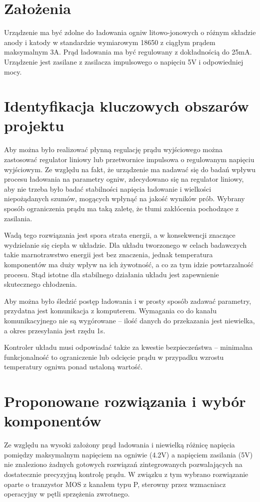 \documentclass[polish,engineer]{polsl-msth}
\begin{document}
\section{Założenia}
Urządzenie ma być zdolne do ładowania ogniw litowo-jonowych o różnym składzie anody i katody w standardzie wymiarowym 18650 z ciągłym prądem maksymalnym 3A. Prąd ładowania ma być regulowany z dokładnością do 25mA. Urządzenie jest zasilane z zasilacza impulsowego o napięciu 5V i odpowiedniej mocy.
\section{Identyfikacja kluczowych obszarów projektu}
Aby można było realizować płynną regulację prądu wyjściowego można zastosować regulator liniowy lub przetwornice impulsowa o regulowanym napięciu wyjściowym. Ze względu na fakt, że urządzenie ma nadawać się do badań wpływu procesu ładowania na parametry ogniw, zdecydowano się na regulator liniowy, aby nie trzeba było badać stabilności napięcia ładowanie i wielkości niepożądanych szumów, mogących wpłynąć na jakość wyników prób. Wybrany sposób ograniczenia prądu ma taką zaletę, że tłumi zakłócenia pochodzące z zasilania.

Wadą tego rozwiązania jest spora strata energii, a w konsekwencji znaczące wydzielanie się ciepła w układzie. Dla układu tworzonego w celach badawczych takie marnotrawstwo energii jest bez znaczenia, jednak temperatura komponentów ma duży wpływ na ich żywotność, a co za tym idzie powtarzalność procesu. Stąd istotne dla stabilnego działania układu jest zapewnienie skutecznego chłodzenia.

Aby można było śledzić postęp ładowania i w prosty sposób zadawać parametry, przydatna jest komunikacja z komputerem. Wymagania co do kanału komunikacyjnego nie są wygórowane – ilość danych do przekazania jest niewielka, a okres przesyłania jest rzędu 1s.

Kontroler układu musi odpowiadać także za kwestie bezpieczeństwa – minimalna funkcjonalność to ograniczenie lub odcięcie prądu w przypadku wzrostu temperatury ogniwa ponad ustaloną wartość.

\section{Proponowane rozwiązania i wybór komponentów}
Ze względu na wysoki założony prąd ładowania i niewielką różnicę napięcia pomiędzy maksymalnym napięciem na ogniwie (4.2V) a napięciem zasilania (5V) nie znaleziono żadnych gotowych rozwiązań zintegrowanych pozwalających na dostatecznie precyzyjną kontrolę prądu. W związku z tym wybrano rozwiązanie oparte o tranzystor MOS z kanałem typu P, sterowny przez wzmacniacz operacyjny w pętli sprzężenia zwrotnego.
\end{document}
